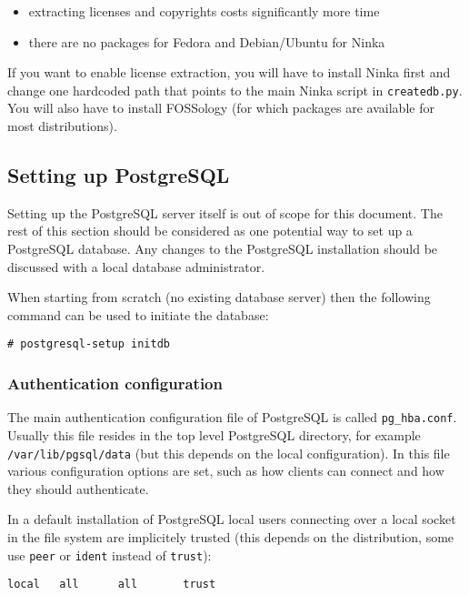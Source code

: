 \documentclass[10pt,a4paper]{article}
\begin{document}
\begin{itemize}
\item extracting licenses and copyrights costs significantly more time
\item there are no packages for Fedora and Debian/Ubuntu for Ninka
\end{itemize}

If you want to enable license extraction, you will have to install Ninka first
and change one hardcoded path that points to the main Ninka script in
\texttt{createdb.py}. You will also have to install FOSSology
(for which packages are available for most distributions).

\subsection{Setting up PostgreSQL}

Setting up the PostgreSQL server itself is out of scope for this document. The
rest of this section should be considered as one potential way to set up a
PostgreSQL database. Any changes to the PostgreSQL installation should be
discussed with a local database administrator.

When starting from scratch (no existing database server) then the following
command can be used to initiate the database:

\begin{verbatim}
# postgresql-setup initdb
\end{verbatim}

\subsubsection{Authentication configuration}

The main authentication configuration file of PostgreSQL is called
\texttt{pg\_hba.conf}. Usually this file resides in the top level PostgreSQL
directory, for example \texttt{/var/lib/pgsql/data} (but this depends on the
local configuration). In this file various configuration options are set, such
as how clients can connect and how they should authenticate.

In a default installation of PostgreSQL local users connecting over a local
socket in the file system are implicitely trusted (this depends on the
distribution, some use \texttt{peer} or \texttt{ident} instead of
\texttt{trust}):

\begin{verbatim}
local   all      all       trust
\end{verbatim}
\end{document}

